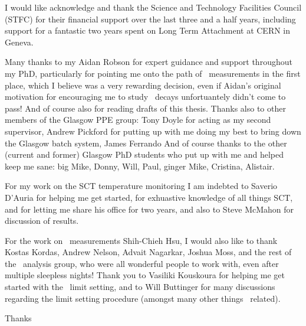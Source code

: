 I would like acknowledge and thank the Science and Technology Facilities Council
(STFC) for their financial support over the last three and a half years,
including support for a fantastic two years spent on Long Term Attachment at CERN
in Geneva.

Many thanks to my Aidan Robson for expert guidance and support throughout my
PhD, particularly for pointing me onto the path of \ZZ\ measurements in the first
place, which I believe was a very rewarding decision, even if Aidan's original
motivation for encouraging me to study \ZZ\ decays unfortuantely didn't come to
pass! And of course also for reading drafts of this thesis. Thanks also to other
members of the Glasgow PPE group: Tony Doyle for acting as my second supervisor,
Andrew Pickford for putting up with me doing my best to bring down the Glasgow
batch system, James Ferrando
And of course thanks to the other (current and former) Glasgow PhD students who put up with me and
helped keep me sane: big Mike, Donny, Will, Paul, ginger Mike, Cristina,
Alistair.

For my work on the SCT temperature monitoring I am indebted to Saverio D'Auria
for helping me get started, for exhuastive knowledge of all things SCT, and for
letting me share his office for two years, and also to Steve McMahon for
discussion of results.

For the work on \ZZ\ measurements Shih-Chieh Hsu, 
I would also like to thank Kostas Kordas, Andrew Nelson, Advait Nagarkar, Joshua
Moss, and the rest of the \ZZ\ analysis group, who
were all wonderful people to work with, even after multiple sleepless nights! Thank you to Vasiliki Kouskoura for
helping me get started with the \TGC\ limit setting, and to Will Buttinger for
many discussions regarding the limit setting procedure (amongst many other
things \ZZ\ related).

Thanks
